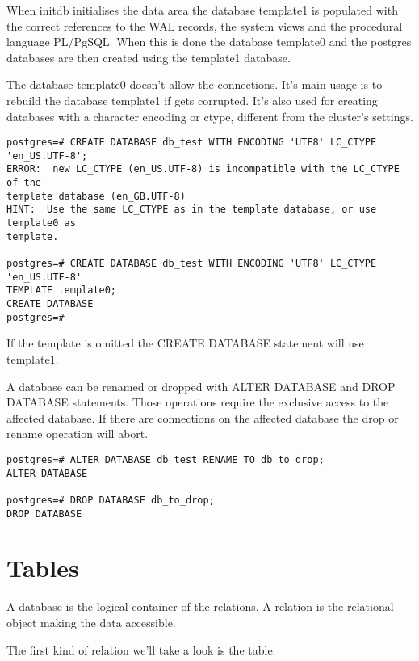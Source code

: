 When initdb initialises the data area the database template1 is populated with the correct
references to the WAL records, the system views and the procedural language PL/PgSQL. When
this is done the database template0 and the postgres databases are then created using the template1
database.

The database template0 doesn't allow the connections. It's main usage is to rebuild the
database template1 if gets corrupted. It's also used for creating databases with a character
encoding or ctype, different from the cluster's settings. 

\begin{lstlisting}[style=pgsql]
postgres=# CREATE DATABASE db_test WITH ENCODING 'UTF8' LC_CTYPE 'en_US.UTF-8';
ERROR:  new LC_CTYPE (en_US.UTF-8) is incompatible with the LC_CTYPE of the 
template database (en_GB.UTF-8)
HINT:  Use the same LC_CTYPE as in the template database, or use template0 as 
template.

postgres=# CREATE DATABASE db_test WITH ENCODING 'UTF8' LC_CTYPE 'en_US.UTF-8' 
TEMPLATE template0;
CREATE DATABASE
postgres=# 

\end{lstlisting}

If the template is omitted the CREATE DATABASE statement will use template1. 

A database can be renamed or dropped with ALTER DATABASE and DROP DATABASE 
statements. Those operations require the exclusive access to the affected database. If there are
connections on the affected database the drop or rename operation will abort.

\begin{lstlisting}[style=pgsql]
postgres=# ALTER DATABASE db_test RENAME TO db_to_drop;
ALTER DATABASE

postgres=# DROP DATABASE db_to_drop;
DROP DATABASE

\end{lstlisting}




\section{Tables}
\label{sec:TABLES}
A database is the logical container of the relations.
A relation is the relational object making the data accessible.

The first kind of relation we'll take a look is the table.

